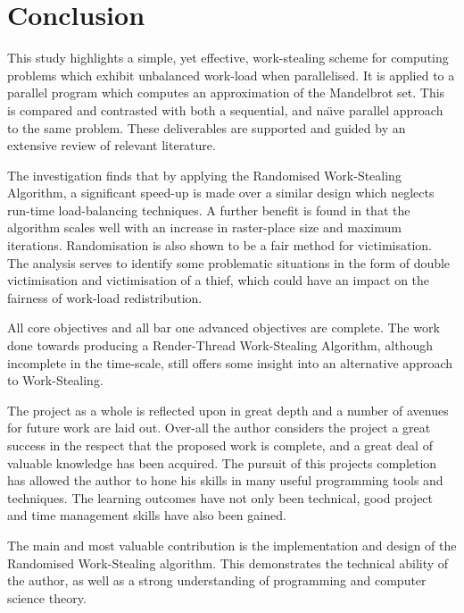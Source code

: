 \newpage
\section{Conclusion}

This study highlights a simple, yet effective, work-stealing scheme for computing problems which exhibit unbalanced work-load when parallelised. 
It is applied to a parallel program which computes an approximation of the Mandelbrot set. This is compared and contrasted with both a sequential,
and na\"{\i}ve parallel approach to the same problem. These deliverables are supported and guided by an extensive review of relevant literature.

The investigation finds that by applying the Randomised Work-Stealing Algorithm, a significant speed-up is made over a similar design which 
neglects run-time load-balancing techniques. A further benefit is found in that the algorithm scales well with an increase in raster-place size and 
maximum iterations. Randomisation is also shown to be a fair method for victimisation. The analysis serves to identify some problematic situations
in the form of double victimisation and victimisation of a thief, which could have an impact on the fairness of work-load redistribution. 

All core objectives and all bar one advanced objectives are complete. The work done towards producing a Render-Thread Work-Stealing Algorithm, although incomplete
in the time-scale, still offers some insight into an alternative approach to Work-Stealing.

The project as a whole is reflected upon in great depth and a number of avenues for future work are laid out. Over-all the author considers the project 
a great success in the respect that the proposed work is complete, and a great deal of valuable knowledge has been acquired.
The pursuit of this projects completion has allowed the author to hone his skills in many useful programming tools and techniques.
The learning outcomes have not only been technical, good project and time management skills have also been gained. 

The main and most valuable contribution is the implementation and design of the Randomised Work-Stealing algorithm. This demonstrates 
the technical ability of the author, as well as a strong understanding of programming and computer science theory.

